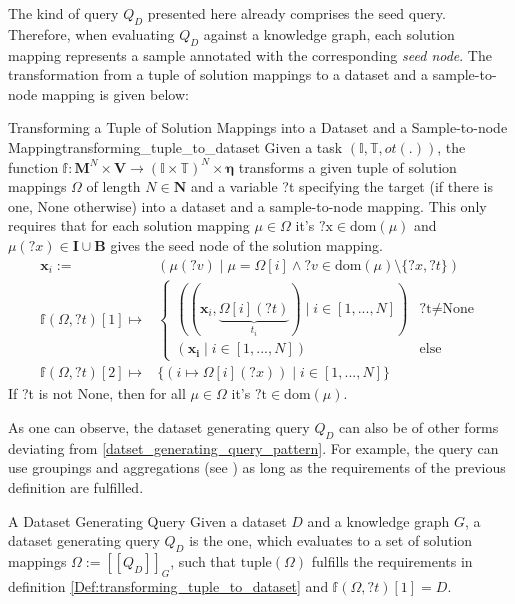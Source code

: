     The kind of query $Q_D$ presented here already comprises the seed query. Therefore, when evaluating $Q_D$ against a knowledge graph, each solution mapping represents a sample annotated with the corresponding \emph{seed node}. The transformation from a tuple of solution mappings to a dataset and a sample-to-node mapping is given below:
    \begin{Def}{Transforming a Tuple of Solution Mappings into a Dataset and a Sample-to-node Mapping}{transforming_tuple_to_dataset}
    Given a task $(\mathbb{I}, \mathbb{T}, ot(.))$, the function $\mathbb{f}: \mathbf{M}^N \times \mathbf{V} \to (\mathbb{I} \times \mathbb{T})^N \times \boldsymbol{\eta}$ transforms a given tuple of solution mappings $\Omega$ of length $N \in \mathbf{N}$ and a variable ?t specifying the target (if there is one, \glqq None\grqq{} otherwise) into a dataset and a sample-to-node mapping. This only requires that for each solution mapping $\mu \in \Omega$ it's $\text{?x} \in \text{dom}(\mu)$ and $\mu(?x) \in \mathbf{I} \cup \mathbf{B}$ gives the seed node of the solution mapping.
    \begin{align*}
        \mathbf{x}_i := & (\mu(?v) \mid \mu = \Omega[i] \land ?v \in \text{dom}(\mu) \setminus \{?x,?t\})\\
        \mathbb{f}(\Omega, ?t)[1] \mapsto & \begin{cases} 
                                                ((\mathbf{x}_i,\underbrace{\Omega[i](?t)}_{t_i}) \mid i \in [1,...,N]) & \text{?t} \neq \text{None}\\ 
                                                (\mathbf{x_i} \mid i \in [1,...,N]) & \text{else} \end{cases}  \\ 
        \mathbb{f}(\Omega, ?t)[2] \mapsto & \{ (i \mapsto \Omega[i](?x))\mid i \in [1,...,N]\}
    \end{align*}
    If ?t is not \glqq None\grqq{}, then for all $\mu \in \Omega$ it's $\text{?t} \in \text{dom}(\mu)$.
    \end{Def}
    As one can observe, the dataset generating query $Q_D$ can also be of other forms deviating from \ref{datset_generating_query_pattern}. For example, the query can use groupings and aggregations (see \cite{sparql1on1}) as long as the requirements of the previous definition are fulfilled.
    
    \begin{Def}{A Dataset Generating Query}{}
    Given a dataset $D$ and a knowledge graph $G$, a dataset generating query $Q_D$ is the one, which evaluates to a set of solution mappings $\Omega := [[Q_D]]_G$, such that $\text{tuple}(\Omega)$ fulfills the requirements in definition \ref{Def:transforming_tuple_to_dataset} and $\mathbb{f}(\Omega, ?t)[1] = D$.
    \end{Def}
    
